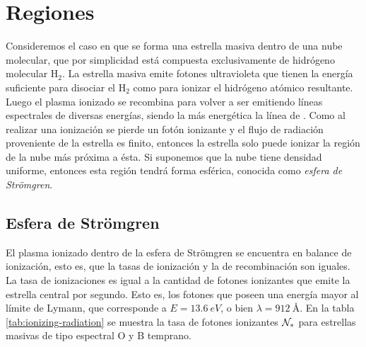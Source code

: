 \appendix
\newcommand{\norm}[1]{\left\lVert#1\right\rVert}

\chapter[Regiones \Ion{H}{II}]{Regiones  \citep{Stahler:2004}}
\label{app:HII}


Consideremos el caso en que se forma una estrella masiva dentro de una nube molecular, que por simplicidad está compuesta exclusivamente de hidrógeno molecular $\mathrm{H_2}$. La estrella masiva emite fotones ultravioleta que tienen la energía suficiente para disociar el $\mathrm{H_2}$  como para ionizar el hidrógeno atómico resultante. Luego el plasma ionizado se recombina para volver a ser  emitiendo líneas espectrales de diversas energías, siendo la más energética la línea de . Como al realizar una ionización se pierde un fotón ionizante y el flujo de radiación proveniente de la estrella es finito, entonces la estrella solo puede ionizar la región de la nube más próxima a ésta. Si suponemos que la nube tiene densidad uniforme, entonces esta región tendrá forma esférica, conocida como \textit{esfera de Strömgren}.

\section{Esfera de Strömgren \citep{Stahler:2004}}

El plasma ionizado dentro de la esfera de Strömgren se encuentra en balance de ionización, esto es, que la tasas de ionización y la de recombinación son iguales. La tasa de ionizaciones es igual a la cantidad de fotones ionizantes que emite la estrella central por segundo. Esto es, los fotones que poseen una energía mayor al límite de Lymann, que corresponde a  $E = \SI{13.6}{eV}$, o bien $\lambda = \SI{912}{\angstrom}$. En la tabla \ref{tab:ionizing-radiation} se muestra la tasa de fotones ionizantes $\mathcal{N}_*$ para estrellas masivas de tipo espectral O y B temprano.

